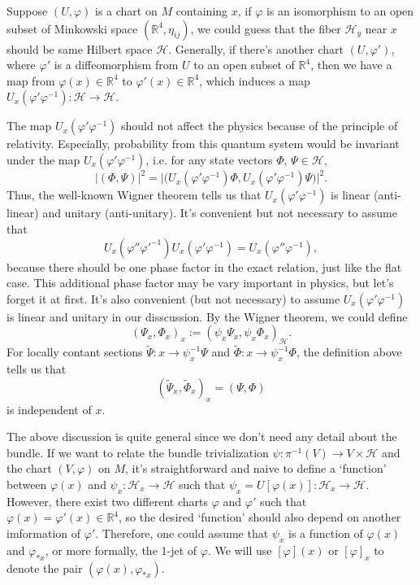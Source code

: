 \documentclass[14pt]{extarticle}
\begin{document}
Suppose $(U,\varphi)$ is a chart on $M$ containing $x$, if $\varphi$ is an isomorphism to an open subset of Minkowski space $(\mathbb R^{4},\eta_{ij})$, we could guess that the fiber $\mathcal H_y$ near $x$ should be same Hilbert space $\mathcal H$. Generally, if there's another chart $(U,\varphi')$, where $\varphi'$ is a diffeomorphism from $U$ to an open subset of $\mathbb R^{4}$, then we have a map from $\varphi(x)\in \mathbb R^4$ to $\varphi'(x)\in \mathbb R^4$, which induces a map $U_x(\varphi'\varphi^{-1}):\mathcal H\to \mathcal H$. 

The map $U_x(\varphi'\varphi^{-1})$ should not affect the physics because of the principle of relativity. Especially, probability from this quantum system would be invariant under the map $U_x(\varphi'\varphi^{-1})$, i.e. for any state vectors $\Phi$, $\Psi\in \mathcal H$, 
\[
	|(\Phi,\Psi)|^2=\bigl|\bigl(U_x(\varphi'\varphi^{-1})\Phi,U_x(\varphi'\varphi^{-1})\Psi\bigr)\bigr|^2.
\]
Thus, the well-known Wigner theorem tells us that $U_x(\varphi'\varphi^{-1})$ is linear (anti-linear) and unitary (anti-unitary). It's convenient but not necessary to assume that 
\[
	U_x(\varphi''\varphi'^{-1})U_x(\varphi'\varphi^{-1})=U_x(\varphi''\varphi^{-1}),
\] 
because there should be one phase factor in the exact relation, just like the flat case. This additional phase factor may be vary important in physics, but let's forget it at first. It's also convenient (but not necessary) to assume $U_x(\varphi'\varphi^{-1})$ is linear and unitary in our disscussion. By the Wigner theorem, we could define
\[
	(\Psi_x,\Phi_x)_x:=\left(\psi_x\Psi_x,\psi_x\Phi_x\right)_{\mathcal H}.
\]
For locally contant sections $\widetilde \Psi:x\to \psi_x^{-1}\Psi$ and $\widetilde \Phi:x\to \psi_x^{-1}\Phi$, the definition above tells us that
\[
	(\widetilde \Psi_x,\widetilde \Phi_x)_x=(\Psi,\Phi)
\]
is independent of $x$.

The above discussion is quite general since we don't need any detail about the bundle. If we want to relate the bundle trivialization $\psi:\pi^{-1}(V)\to V\times \mathcal H$ and the chart $(V,\varphi)$ on $M$, it's straightforward and naive to define a `function' between $\varphi(x)$ and $\psi_x:\mathcal H_x\to \mathcal H$ such that $\psi_x=U[\varphi(x)]:\mathcal H_x\to \mathcal H$. However, there exist two different charts $\varphi$ and $\varphi'$ such that $\varphi(x)=\varphi'(x)\in \mathbb R^4$, so the desired `function' should also depend on another imformation of $\varphi'$. Therefore, one could assume that $\psi_x$ is a function of $\varphi(x)$ and $\varphi_{*x}$, or more formally, the 1-jet of $\varphi$. We will use $[\varphi](x)$ or $[\varphi]_x$ to denote the pair $(\varphi(x),\varphi_{*x})$.
\end{document}
